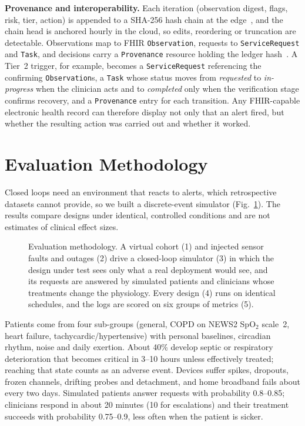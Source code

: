 \documentclass[journal,twoside,web]{IEEEmiot}
\begin{document}
\textbf{Provenance and interoperability.} Each iteration (observation digest, flags, risk, tier, action) is appended to
a SHA-256 hash chain at the edge~\cite{haber1991}, and the chain head is anchored hourly in the cloud, so edits,
reordering or truncation are detectable. Observations map to FHIR \texttt{Observation}, requests to
\texttt{ServiceRequest} and \texttt{Task}, and decisions carry a \texttt{Provenance} resource holding the ledger
hash~\cite{fhir}. A Tier~2 trigger, for example, becomes a \texttt{ServiceRequest} referencing the confirming
\texttt{Observation}s, a \texttt{Task} whose status moves from \emph{requested} to \emph{in-progress} when the clinician
acts and to \emph{completed} only when the verification stage confirms recovery, and a \texttt{Provenance} entry for
each transition. Any FHIR-capable electronic health record can therefore display not only that an alert fired, but
whether the resulting action was carried out and whether it worked.

\section{Evaluation Methodology}

Closed loops need an environment that reacts to alerts, which retrospective datasets cannot provide, so we built a
discrete-event simulator (Fig.~\ref{fig:method}). The results compare designs under identical, controlled conditions
and are not estimates of clinical effect sizes.

\begin{figure}[t]
\centering
\resizebox{\textwidth}{!}{}
\caption{Evaluation methodology. A virtual cohort (1) and injected sensor faults and outages (2) drive a closed-loop
simulator (3) in which the design under test sees only what a real deployment would see, and its requests are answered
by simulated patients and clinicians whose treatments change the physiology. Every design (4) runs on identical
schedules, and the logs are scored on six groups of metrics (5).}
\label{fig:method}
\end{figure}

Patients come from four sub-groups (general, COPD on NEWS2 SpO$_2$ scale~2, heart failure, tachycardic/hypertensive)
with personal baselines, circadian rhythm, noise and daily exertion. About 40\% develop septic or respiratory
deterioration that becomes critical in 3--10 hours unless effectively treated; reaching that state counts as an adverse
event. Devices suffer spikes, dropouts, frozen channels, drifting probes and detachment, and home broadband fails about
every two days. Simulated patients answer requests with probability 0.8--0.85; clinicians respond in about 20 minutes
(10 for escalations) and their treatment succeeds with probability 0.75--0.9, less often when the patient is sicker.
\end{document}
